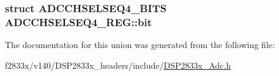\subsubsection[{bit}]{\setlength{\rightskip}{0pt plus 5cm}struct {\bf A\+D\+C\+C\+H\+S\+E\+L\+S\+E\+Q4\+\_\+\+B\+I\+T\+S} A\+D\+C\+C\+H\+S\+E\+L\+S\+E\+Q4\+\_\+\+R\+E\+G\+::bit}\label{union_a_d_c_c_h_s_e_l_s_e_q4___r_e_g_a3c932b9c01c8c20d08e05a337ecf8a9f}


The documentation for this union was generated from the following file\+:\begin{DoxyCompactItemize}
\item 
f2833x/v140/\+D\+S\+P2833x\+\_\+headers/include/\hyperlink{_d_s_p2833x___adc_8h}{D\+S\+P2833x\+\_\+\+Adc.\+h}\end{DoxyCompactItemize}
